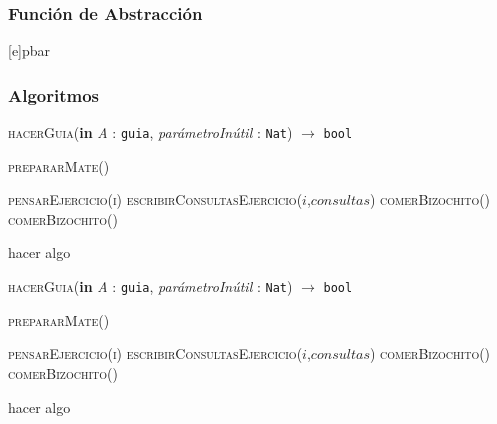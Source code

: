 \subsubsection*{Función de Abstracción}
[e]{p}{bar}

\subsubsection*{Algoritmos}
\begin{algorithm}[H]
  \caption{\textsc{hacerGuia}(\textbf{in} \textit{A} : \texttt{guia}, \textit{parámetroInútil} : \texttt{Nat}) $\longrightarrow$ \texttt{bool}}
  \begin{algorithmic}[1]
    \State {} 

    \State {} 

    \State {}

    \State \textsc{prepararMate()} 

    \State \textsc{pensarEjercicio(i)}
      \State \textsc{escribirConsultasEjercicio($i$,$consultas$)}
    \Else
      \State \textsc{comerBizochito()}
    \EndIf
      \State \textsc{comerBizochito()}
    \EndWhile

         \State hacer algo
    \EndFor

    \State {}
  \end{algorithmic}
\end{algorithm}
\begin{algorithm}[H]
  \caption{\textsc{hacerGuia}(\textbf{in} \textit{A} : \texttt{guia}, \textit{parámetroInútil} : \texttt{Nat}) $\longrightarrow$ \texttt{bool}}
  \begin{algorithmic}[1]
    \State {} 

    \State {} 

    \State {}

    \State \textsc{prepararMate()} 

    \State \textsc{pensarEjercicio(i)}
      \State \textsc{escribirConsultasEjercicio($i$,$consultas$)}
    \Else
      \State \textsc{comerBizochito()}
    \EndIf
      \State \textsc{comerBizochito()}
    \EndWhile

         \State hacer algo
    \EndFor

    \State {}
  \end{algorithmic}
\end{algorithm}
\newpage

